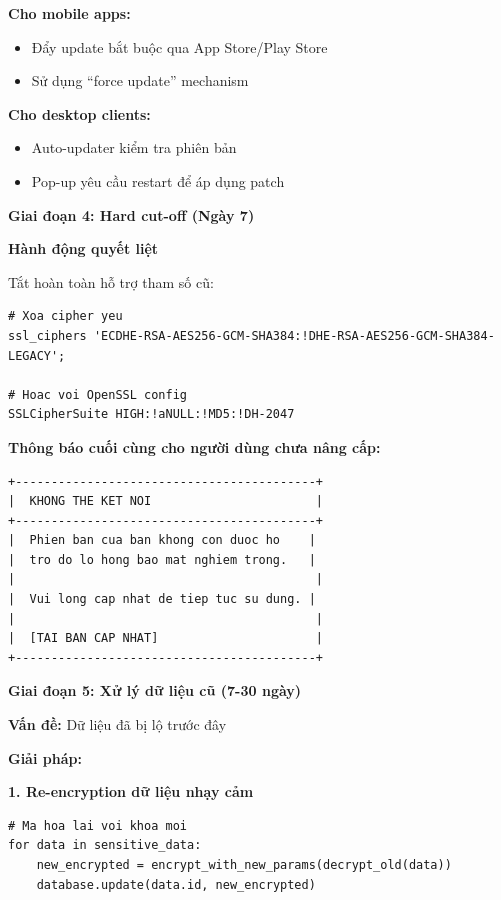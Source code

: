 \textbf{Cho mobile apps:}
\begin{itemize}
    \item Đẩy update bắt buộc qua App Store/Play Store
    \item Sử dụng ``force update'' mechanism
\end{itemize}

\textbf{Cho desktop clients:}
\begin{itemize}
    \item Auto-updater kiểm tra phiên bản
    \item Pop-up yêu cầu restart để áp dụng patch
\end{itemize}

\textbf{Giai đoạn 4: Hard cut-off (Ngày 7)}

\textbf{Hành động quyết liệt}

Tắt hoàn toàn hỗ trợ tham số cũ:

\begin{verbatim}
# Xoa cipher yeu
ssl_ciphers 'ECDHE-RSA-AES256-GCM-SHA384:!DHE-RSA-AES256-GCM-SHA384-LEGACY';

# Hoac voi OpenSSL config
SSLCipherSuite HIGH:!aNULL:!MD5:!DH-2047
\end{verbatim}

\textbf{Thông báo cuối cùng cho người dùng chưa nâng cấp:}

\begin{verbatim}
+------------------------------------------+
|  KHONG THE KET NOI                       |
+------------------------------------------+
|  Phien ban cua ban khong con duoc ho    |
|  tro do lo hong bao mat nghiem trong.   |
|                                          |
|  Vui long cap nhat de tiep tuc su dung. |
|                                          |
|  [TAI BAN CAP NHAT]                      |
+------------------------------------------+
\end{verbatim}

\textbf{Giai đoạn 5: Xử lý dữ liệu cũ (7-30 ngày)}

\textbf{Vấn đề:} Dữ liệu đã bị lộ trước đây

\textbf{Giải pháp:}

\textbf{1. Re-encryption dữ liệu nhạy cảm}

\begin{verbatim}
# Ma hoa lai voi khoa moi
for data in sensitive_data:
    new_encrypted = encrypt_with_new_params(decrypt_old(data))
    database.update(data.id, new_encrypted)
\end{verbatim}

